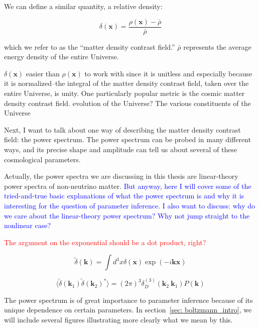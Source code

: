 We can define a similar quantity, a relative density:

\begin{equation}
\delta(\bm{x}) = \frac{\rho(\bm{x}) - \bar{\rho}}{\bar{\rho}}
\end{equation}

which we refer to as the ``matter density contrast field.'' $\bar{\rho}$
represents the average energy density of the entire Universe.

$\delta(\bm{x})$ easier than $\rho(\bm{x})$ to work with since it
is unitless and especially because it is normalized--the integral of the
matter density contrast field, taken over the entire Universe, is unity. One particularly popular metric is the cosmic matter density 
contrast field. evolution of the Universe? The various constituents of the Universe 

Next, I want to talk about one way of describing the matter density contrast 
field: the power spectrum. The power spectrum can be probed in many different 
ways, and its precise shape and amplitude can tell us about several of these 
cosmological parameters.

Actually, the power spectra we are discussing in this thesis are linear-theory
power spectra of non-neutrino matter. \textcolor{blue}{But anyway, here I will cover some of 
the tried-and-true basic explanations of what the power spectrum is and why it 
is interesting for the question of parameter inference. I also want to 
discuss: why do we care about the linear-theory power spectrum? Why not jump 
straight to the nonlinear case?}

\textcolor{red}{The argument on the exponential should be a dot product, 
right?}

\begin{equation}
\tilde{\delta} (\bm{k}) = \int d^3 x \delta(\bm{x}) \exp(-i \bm{k} \bm{x})
\end{equation}

\begin{equation}
\langle \tilde{\delta} (\bm{k}_1) \tilde{\delta} (\bm{k}_2)^* \rangle
=
(2 \pi)^3 \delta_D^{(3)} (\bm{k}_2 \ \bm{k}_1) P(\bm{k})
\end{equation}


The power spectrum is of great importance to parameter inference because of
its unique dependence on certain parameters.
In section~\ref{sec: boltzmann_intro}, we will include several figures 
illustrating more clearly what we mean by this.

